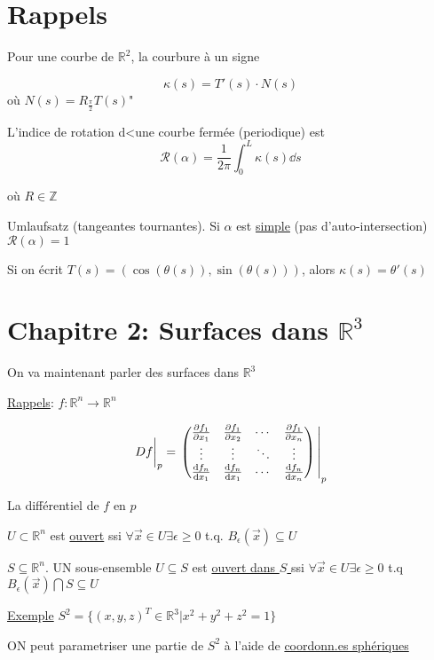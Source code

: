 


\section*{Rappels}

Pour une courbe de $\mathbb{R}^2$, la courbure à un signe

$$\kappa(s) = T'(s)\cdot N(s)$$ 
où $N(s) = R_{\frac{\pi}{2} } T(s)$" 

L'indice de rotation d<une courbe fermée (periodique) est $$\mathcal R(\alpha)=\frac{1}{2\pi} \int_0^L\kappa(s)\dd s$$ 

où $R\in \mathbb{Z}$ 

Umlaufsatz (tangeantes tournantes). Si $\alpha$ est \underline{simple} (pas d'auto-intersection) $\mathcal R(\alpha)=1$  

Si on écrit $T(s) = (\cos(\theta(s)),\sin(\theta(s)))$, alors $\kappa(s)=\theta'(s)$  


\section*{Chapitre 2: Surfaces dans $\mathbb{R}^3$}

On va maintenant parler des surfaces dans $\mathbb{R}^3$ 

\underline{Rappels}: $f: \mathbb{R}^n\to \mathbb{R}^n$  

$$\eval{Df}_p = \eval{\begin{pmatrix} \pdv{f_1}{x_1} & \pdv{f_1}{x_2}&  \dotsb & \pdv{f_1}{x_n}\\ \vdots & \vdots & \ddots & \vdots\\ \dv{f_n}{x_1} & \dv{f_n}{x_1}& \dotsb& \dv{f_n}{x_n}
\end{pmatrix}}_p$$ 


La différentiel de $f$ en $p$

$U \subset \mathbb{R}^n$ est \underline{ouvert} ssi $\forall \vec x \in U \exists \epsilon \geq 0$ t.q. $B_\epsilon(\vec x) \subseteq U$    

$S \subseteq \mathbb{R}^n$. UN sous-ensemble $U\subseteq S$ est \underline{ouvert dans $S$ } ssi $\forall \vec x \in U \exists \epsilon \ge 0$ t.q $B_\epsilon (\vec x) \bigcap S \subseteq U$    

\underline{Exemple} $S^2 = \{(x,y,z)^T \in \mathbb{R}^3 | x^2 + y^2 + z^2 =1\}$  

ON peut parametriser une partie de $S^2$ à l'aide de \underline{coordonn.es sphériques} 



